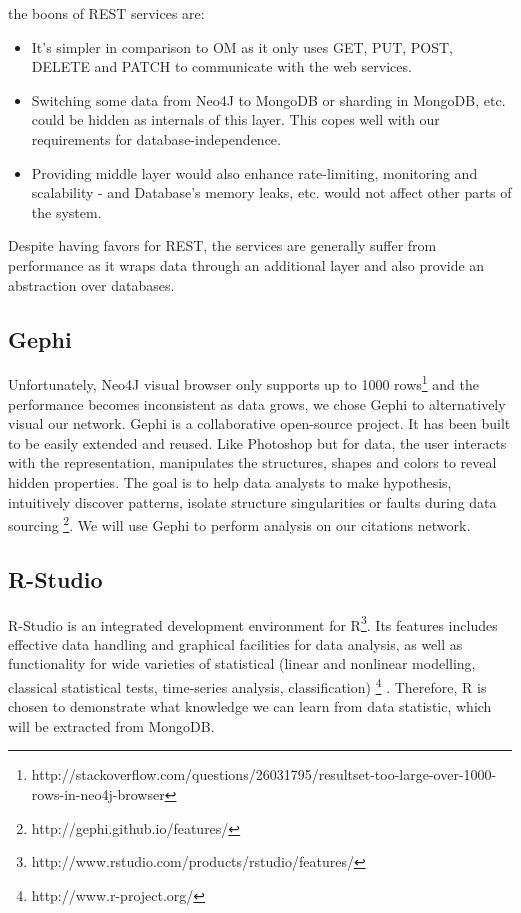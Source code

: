 \documentclass{sig-alternate}
\begin{document}
{the boons of REST services are:
\begin{itemize}
\item It's simpler in comparison to OM as it only uses GET, PUT, POST, DELETE and PATCH to communicate with the web services.
\item  Switching some data from Neo4J to MongoDB or sharding in MongoDB, etc. could be hidden as internals of this layer. This copes well with our requirements for database-independence.
\item Providing middle layer would also enhance rate-limiting, monitoring and scalability - and Database's memory leaks, etc. would not affect other parts of the system.
\end{itemize}

Despite having favors for REST, the services are generally suffer from performance as it wraps data through an additional layer and also provide an abstraction over databases.
\subsection{Gephi}
Unfortunately, Neo4J visual browser only supports up to 1000 rows\footnote{http://stackoverflow.com/questions/26031795/resultset-too-large-over-1000-rows-in-neo4j-browser} and the performance becomes inconsistent as data grows, we chose Gephi to alternatively visual our network. Gephi is a collaborative open-source project. It has been built to be easily extended and reused. Like Photoshop but for data, the user interacts with the representation, manipulates the structures, shapes and colors to reveal hidden properties. The goal is to help data analysts to make hypothesis, intuitively discover patterns, isolate structure singularities or faults during data sourcing \footnote{http://gephi.github.io/features/}. We will use Gephi to perform analysis on our citations network.

\subsection{R-Studio}

R-Studio is an integrated development  environment for R\footnote{http://www.rstudio.com/products/rstudio/features/}. Its features includes effective data handling and graphical facilities for data analysis, as well as functionality for wide varieties of statistical (linear and nonlinear modelling, classical statistical tests, time-series analysis, classification) \footnote{http://www.r-project.org/} . Therefore, R is chosen to demonstrate what knowledge we can learn from data statistic, which will be extracted from MongoDB.

}
\end{document}
